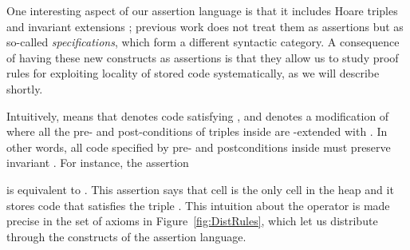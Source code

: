 \documentclass{LMCS}
\theoremstyle{remark}
\begin{document}
One interesting aspect of our assertion language is that it includes Hoare triples 
 and invariant extensions ; previous work
\cite{BirkedalL:semslt-lmcs,Birkedal:Reus:Schwinghammer:Yang:08} does not treat them as assertions 
but as so-called \emph{specifications}, which form a different syntactic category. 
A consequence of having these new constructs as assertions
is that they allow us to study proof rules for exploiting locality of stored code
systematically, as we will describe shortly.

Intuitively,  means that  denotes code 
satisfying , and  denotes a modification of  where 
all the pre- and post-conditions of triples inside  are -extended with . In other words,
all code specified by pre- and postconditions inside  must preserve  invariant . For instance,
the assertion

is equivalent to
.
This assertion says that cell  is the only cell in the heap
and it stores code  that satisfies the triple .
This intuition about the  operator is made precise in the set of
axioms in Figure~\ref{fig:DistRules}, which let us distribute  through
  the constructs of the assertion language. 
\end{document}
